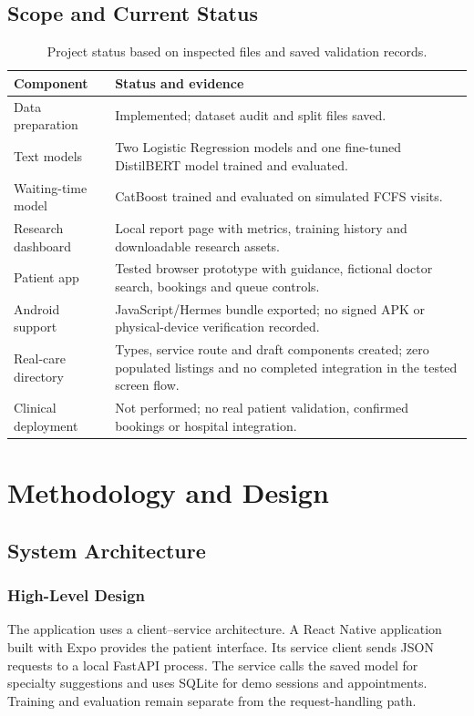 \documentclass{tietreport}
\begin{document}
\section{Scope and Current Status}
\begin{table}[H]\centering\small
\begin{tabularx}{\textwidth}{p{}Y}
\toprule Component & Status and evidence \\ \midrule
Data preparation & Implemented; dataset audit and split files saved. \\
Text models & Two Logistic Regression models and one fine-tuned DistilBERT model trained and evaluated. \\
Waiting-time model & CatBoost trained and evaluated on simulated FCFS visits. \\
Research dashboard & Local report page with metrics, training history and downloadable research assets. \\
Patient app & Tested browser prototype with guidance, fictional doctor search, bookings and queue controls. \\
Android support & JavaScript/Hermes bundle exported; no signed APK or physical-device verification recorded. \\
Real-care directory & Types, service route and draft components created; zero populated listings and no completed integration in the tested screen flow. \\
Clinical deployment & Not performed; no real patient validation, confirmed bookings or hospital integration. \\
\bottomrule
\end{tabularx}
\caption{Project status based on inspected files and saved validation records.}
\end{table}

\chapter{Methodology and Design}
\section{System Architecture}
\subsection{High-Level Design}
The application uses a client--service architecture. A React Native application built with Expo provides the patient interface. Its service client sends JSON requests to a local FastAPI process. The service calls the saved model for specialty suggestions and uses SQLite for demo sessions and appointments. Training and evaluation remain separate from the request-handling path.
\end{document}
